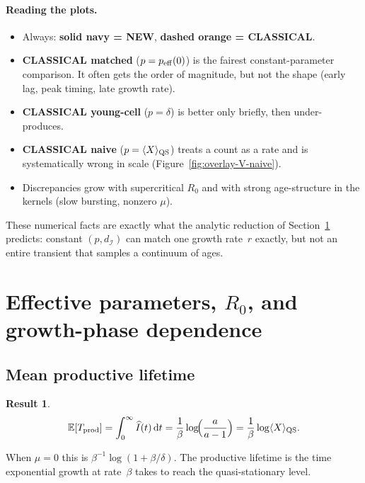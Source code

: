 \documentclass[11pt,a4paper]{article}
\newcommand{\dd}{{\rm d}}
\newcommand{\E}{\mathbb{E}}
\newcommand{\Ihat}{\widehat{I}}
\newcommand{\Icell}{\mathcal{I}}
\theoremstyle{plain}
\newtheorem{result}{Result}[section]
\theoremstyle{definition}
\theoremstyle{remark}
\begin{document}
\paragraph{Reading the plots.}
\begin{itemize}
\item Always: \textbf{solid navy = NEW}, \textbf{dashed orange = CLASSICAL}.
\item \textbf{CLASSICAL matched} ($p=p_{\rm eff}(0)$) is the fairest
constant-parameter comparison. It often gets the order of magnitude, but not
the shape (early lag, peak timing, late growth rate).
\item \textbf{CLASSICAL young-cell} ($p=\delta$) is better only briefly, then
under-produces.
\item \textbf{CLASSICAL naive} ($p=\langle X\rangle_{\rm QS}$) treats a count as a
rate and is systematically wrong in scale
(Figure~\ref{fig:overlay-V-naive}).
\item Discrepancies grow with supercritical $R_0$ and with strong
age-structure in the kernels (slow bursting, nonzero $\mu$).
\end{itemize}
These numerical facts are exactly what the analytic reduction of
Section~\ref{sec:peff} predicts: constant $(p,d_{\Icell})$ can match one growth
rate~$r$ exactly, but not an entire transient that samples a continuum of
ages.

\section{Effective parameters, $R_0$, and growth-phase dependence}
\label{sec:peff}

\subsection{Mean productive lifetime}

\begin{result}
\begin{equation}
\E[T_{\rm prod}]
=\int_0^\infty\Ihat(t)\,\dd t
=\frac{1}{\beta}\log\!\Bigl(\frac{a}{a-1}\Bigr)
=\frac{1}{\beta}\log\langle X\rangle_{\rm QS}.
\end{equation}
\end{result}
When $\mu=0$ this is $\beta^{-1}\log(1+\beta/\delta)$. The productive lifetime
is the time exponential growth at rate~$\beta$ takes to reach the
quasi-stationary level.
\end{document}
